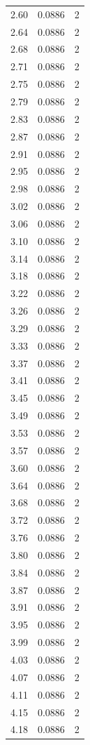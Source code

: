 \begin{longtable}{lrr}
  2.60 & 0.0886 & 2 \\
  2.64 & 0.0886 & 2 \\
  2.68 & 0.0886 & 2 \\
  2.71 & 0.0886 & 2 \\
  2.75 & 0.0886 & 2 \\
  2.79 & 0.0886 & 2 \\
  2.83 & 0.0886 & 2 \\
  2.87 & 0.0886 & 2 \\
  2.91 & 0.0886 & 2 \\
  2.95 & 0.0886 & 2 \\
  2.98 & 0.0886 & 2 \\
  3.02 & 0.0886 & 2 \\
  3.06 & 0.0886 & 2 \\
  3.10 & 0.0886 & 2 \\
  3.14 & 0.0886 & 2 \\
  3.18 & 0.0886 & 2 \\
  3.22 & 0.0886 & 2 \\
  3.26 & 0.0886 & 2 \\
  3.29 & 0.0886 & 2 \\
  3.33 & 0.0886 & 2 \\
  3.37 & 0.0886 & 2 \\
  3.41 & 0.0886 & 2 \\
  3.45 & 0.0886 & 2 \\
  3.49 & 0.0886 & 2 \\
  3.53 & 0.0886 & 2 \\
  3.57 & 0.0886 & 2 \\
  3.60 & 0.0886 & 2 \\
  3.64 & 0.0886 & 2 \\
  3.68 & 0.0886 & 2 \\
  3.72 & 0.0886 & 2 \\
  3.76 & 0.0886 & 2 \\
  3.80 & 0.0886 & 2 \\
  3.84 & 0.0886 & 2 \\
  3.87 & 0.0886 & 2 \\
  3.91 & 0.0886 & 2 \\
  3.95 & 0.0886 & 2 \\
  3.99 & 0.0886 & 2 \\
  4.03 & 0.0886 & 2 \\
  4.07 & 0.0886 & 2 \\
  4.11 & 0.0886 & 2 \\
  4.15 & 0.0886 & 2 \\
  4.18 & 0.0886 & 2 \\

\end{longtable}
